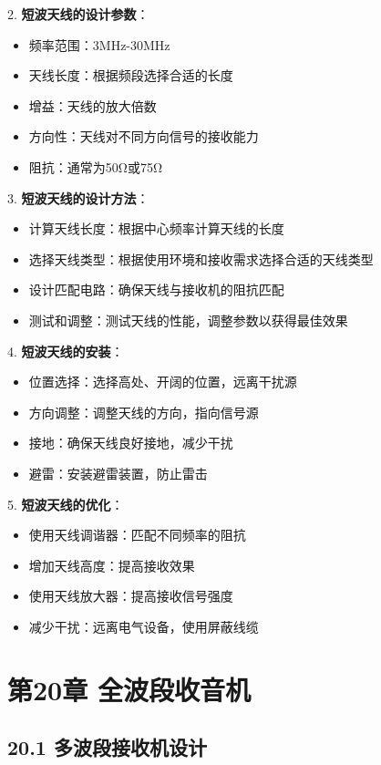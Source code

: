 \documentclass[12pt,UTF8]{ctexbook}
\begin{document}
2. \textbf{短波天线的设计参数}：
   \begin{itemize}[leftmargin=3.5em]
   \item 频率范围：3MHz-30MHz
   \item 天线长度：根据频段选择合适的长度
   \item 增益：天线的放大倍数
   \item 方向性：天线对不同方向信号的接收能力
   \item 阻抗：通常为50Ω或75Ω
   \end{itemize}

3. \textbf{短波天线的设计方法}：
   \begin{itemize}[leftmargin=3.5em]
   \item 计算天线长度：根据中心频率计算天线的长度
   \item 选择天线类型：根据使用环境和接收需求选择合适的天线类型
   \item 设计匹配电路：确保天线与接收机的阻抗匹配
   \item 测试和调整：测试天线的性能，调整参数以获得最佳效果
   \end{itemize}

4. \textbf{短波天线的安装}：
   \begin{itemize}[leftmargin=3.5em]
   \item 位置选择：选择高处、开阔的位置，远离干扰源
   \item 方向调整：调整天线的方向，指向信号源
   \item 接地：确保天线良好接地，减少干扰
   \item 避雷：安装避雷装置，防止雷击
   \end{itemize}

5. \textbf{短波天线的优化}：
   \begin{itemize}[leftmargin=3.5em]
   \item 使用天线调谐器：匹配不同频率的阻抗
   \item 增加天线高度：提高接收效果
   \item 使用天线放大器：提高接收信号强度
   \item 减少干扰：远离电气设备，使用屏蔽线缆
   \end{itemize}

\chapter*{第20章 全波段收音机}
\section*{20.1 多波段接收机设计}
\end{document}
